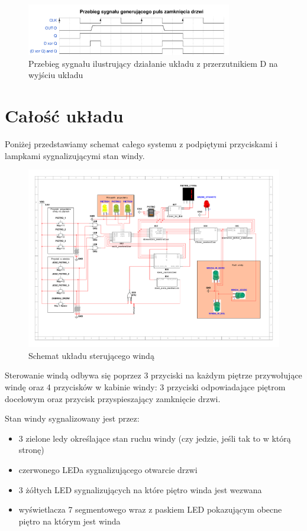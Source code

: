 \documentclass[a4paper]{article}
\begin{document}
\begin{figure}[H]
    \centering
    \includegraphics[width=0.8\textwidth]{output_waveform.pdf}
    \caption{Przebieg sygnału ilustrujący działanie układu z przerzutnikiem D na wyjściu układu}
\end{figure}

\section{Całość układu}
Poniżej przedstawiamy schemat całego systemu z podpiętymi przyciskami i lampkami sygnalizującymi stan windy.
\begin{figure}[H]
    \centering
    \includegraphics[width=\textwidth]{elevator_system_schemat.pdf}
    \caption{Schemat układu sterującego windą}
\end{figure}
Sterowanie windą odbywa się poprzez 3 przyciski na każdym piętrze przywołujące windę oraz
4 przycisków w kabinie windy: 3 przyciski odpowiadające piętrom docelowym oraz przycisk przyspieszający
zamknięcie drzwi. 

Stan windy sygnalizowany jest przez:
\begin{itemize}
    \item 3 zielone ledy określające stan ruchu windy (czy jedzie, jeśli tak to
w którą stronę)
    \item czerwonego LEDa sygnalizującego otwarcie drzwi
    \item 3 żółtych LED sygnalizujących na które piętro winda jest wezwana
    \item wyświetlacza 7 segmentowego wraz z paskiem LED pokazującym obecne piętro na którym jest winda
\end{itemize}
\end{document}
